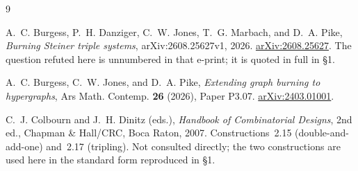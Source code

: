 \documentclass[11pt]{amsart}
\begin{document}
\begin{thebibliography}{9}

A.~C. Burgess, P.~H. Danziger, C.~W. Jones, T.~G. Marbach, and D.~A. Pike,
\emph{Burning Steiner triple systems},
arXiv:2608.25627v1, 2026.
\href{https://arxiv.org/abs/2608.25627}{arXiv:2608.25627}.
The question refuted here is unnumbered in that e-print; it is quoted in full
in \S1.

A.~C. Burgess, C.~W. Jones, and D.~A. Pike,
\emph{Extending graph burning to hypergraphs},
Ars Math. Contemp. \textbf{26} (2026), Paper P3.07.
\href{https://arxiv.org/abs/2403.01001}{arXiv:2403.01001}.

C.~J. Colbourn and J.~H. Dinitz (eds.),
\emph{Handbook of Combinatorial Designs}, 2nd ed.,
Chapman \& Hall/CRC, Boca Raton, 2007.
Constructions~2.15 (double-and-add-one) and~2.17 (tripling). Not consulted
directly; the two constructions are used here in the standard form reproduced
in \S1.

\end{thebibliography}
\end{document}
